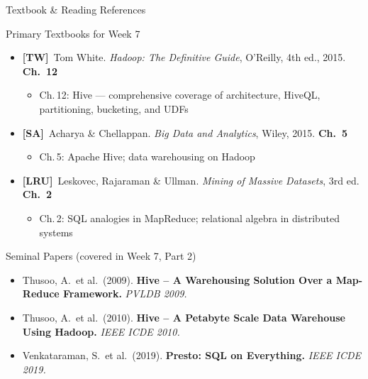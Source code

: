 \documentclass[aspectratio=169,10pt]{beamer}
\begin{document}
\begin{frame}{Textbook \& Reading References}
  \begin{block}{Primary Textbooks for Week 7}
    \begin{itemize}
      \item \textbf{[TW]}\ Tom White. \textit{Hadoop: The Definitive Guide}, O'Reilly, 4th ed., 2015.
            \hfill \textbf{Ch.\ 12}
            \begin{itemize}
              \small\item Ch.\,12: Hive — comprehensive coverage of architecture, HiveQL, partitioning, bucketing, and UDFs
            \end{itemize}
      \item \textbf{[SA]}\ Acharya \& Chellappan. \textit{Big Data and Analytics}, Wiley, 2015.
            \hfill \textbf{Ch.\ 5}
            \begin{itemize}
              \small\item Ch.\,5: Apache Hive; data warehousing on Hadoop
            \end{itemize}
      \item \textbf{[LRU]}\ Leskovec, Rajaraman \& Ullman. \textit{Mining of Massive Datasets}, 3rd ed.
            \hfill \textbf{Ch.\ 2}
            \begin{itemize}
              \small\item Ch.\,2: SQL analogies in MapReduce; relational algebra in distributed systems
            \end{itemize}
    \end{itemize}
  \end{block}
  \vspace{6pt}
  \begin{exampleblock}{Seminal Papers (covered in Week 7, Part 2)}
    \begin{itemize}
      \small
      \item Thusoo, A.\ et al.\ (2009). \textbf{Hive -- A Warehousing Solution Over a Map-Reduce Framework.}
            \textit{PVLDB 2009.}
      \item Thusoo, A.\ et al.\ (2010). \textbf{Hive -- A Petabyte Scale Data Warehouse Using Hadoop.}
            \textit{IEEE ICDE 2010.}
      \item Venkataraman, S.\ et al.\ (2019). \textbf{Presto: SQL on Everything.}
            \textit{IEEE ICDE 2019.}
    \end{itemize}
  \end{exampleblock}
\end{frame}
\end{document}
